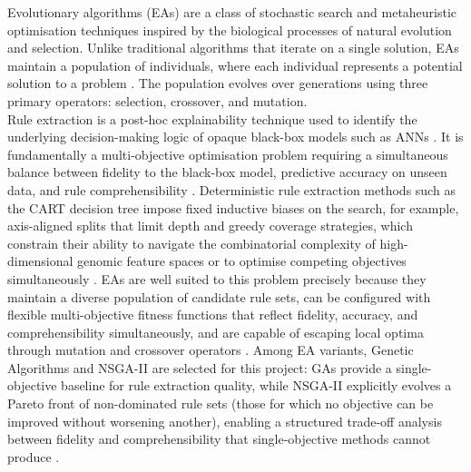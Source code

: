 \label{ssub:ea}

Evolutionary algorithms (EAs) are a class of stochastic search and metaheuristic optimisation
techniques inspired by the biological processes of natural evolution and selection. Unlike traditional
algorithms that iterate on a single solution, EAs maintain a population of individuals, where each
individual represents a potential solution to a problem \cite{Yedjour2024}. The population evolves over
generations using three primary operators: selection, crossover, and mutation.
\\
Rule extraction is a post-hoc explainability technique used to identify the underlying decision-making
logic of opaque black-box models such as ANNs \cite{Yedjour2024,Ghasemi2024}. It is fundamentally a
multi-objective optimisation problem requiring a simultaneous balance between fidelity to the
black-box model, predictive accuracy on unseen data, and rule comprehensibility \cite{Yedjour2024}.
Deterministic rule extraction methods such as the CART decision tree \cite{Breiman1984} impose fixed
inductive biases on the search, for example, axis-aligned splits that limit depth and greedy coverage
strategies, which
constrain their ability to navigate the combinatorial complexity of high-dimensional genomic feature
spaces or to optimise competing objectives simultaneously \cite{Arrieta2020,Yedjour2024}. EAs are
well suited to this problem precisely because they maintain a diverse population of candidate rule
sets, can be configured with flexible multi-objective fitness functions that reflect fidelity,
accuracy, and comprehensibility simultaneously, and are capable of escaping local optima through
mutation and crossover operators \cite{Yedjour2024}. Among EA variants, Genetic Algorithms and NSGA-II
are selected for this project: GAs provide a single-objective baseline for rule extraction quality,
while NSGA-II explicitly evolves a Pareto front of non-dominated rule sets (those for which no
objective can be improved without worsening another), enabling a structured
trade-off analysis between fidelity and comprehensibility that single-objective methods cannot produce
\cite{Yedjour2024}.